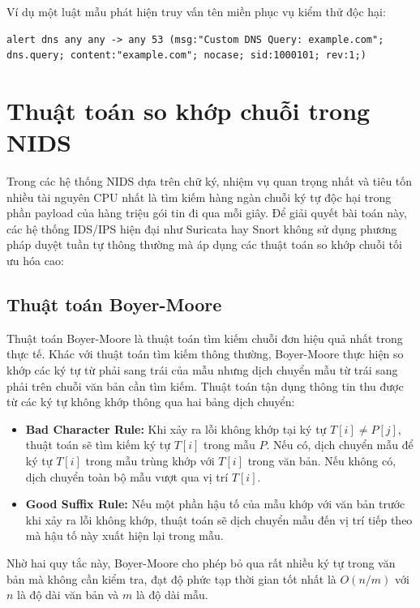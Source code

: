 Ví dụ một luật mẫu phát hiện truy vấn tên miền phục vụ kiểm thử độc hại:
\begin{verbatim}
alert dns any any -> any 53 (msg:"Custom DNS Query: example.com";
dns.query; content:"example.com"; nocase; sid:1000101; rev:1;)
\end{verbatim}

\section{Thuật toán so khớp chuỗi trong NIDS}
Trong các hệ thống NIDS dựa trên chữ ký, nhiệm vụ quan trọng nhất và tiêu tốn nhiều tài nguyên CPU nhất là tìm kiếm hàng ngàn chuỗi ký tự độc hại trong phần payload của hàng triệu gói tin đi qua mỗi giây. Để giải quyết bài toán này, các hệ thống IDS/IPS hiện đại như Suricata hay Snort không sử dụng phương pháp duyệt tuần tự thông thường mà áp dụng các thuật toán so khớp chuỗi tối ưu hóa cao:

\subsection{Thuật toán Boyer-Moore}
Thuật toán Boyer-Moore là thuật toán tìm kiếm chuỗi đơn hiệu quả nhất trong thực tế. Khác với thuật toán tìm kiếm thông thường, Boyer-Moore thực hiện so khớp các ký tự từ phải sang trái của mẫu nhưng dịch chuyển mẫu từ trái sang phải trên chuỗi văn bản cần tìm kiếm. 
Thuật toán tận dụng thông tin thu được từ các ký tự không khớp thông qua hai bảng dịch chuyển:
\begin{itemize}
    \item \textbf{Bad Character Rule:} Khi xảy ra lỗi không khớp tại ký tự $T[i] \neq P[j]$, thuật toán sẽ tìm kiếm ký tự $T[i]$ trong mẫu $P$. Nếu có, dịch chuyển mẫu để ký tự $T[i]$ trong mẫu trùng khớp với $T[i]$ trong văn bản. Nếu không có, dịch chuyển toàn bộ mẫu vượt qua vị trí $T[i]$.
    \item \textbf{Good Suffix Rule:} Nếu một phần hậu tố của mẫu khớp với văn bản trước khi xảy ra lỗi không khớp, thuật toán sẽ dịch chuyển mẫu đến vị trí tiếp theo mà hậu tố này xuất hiện lại trong mẫu.
\end{itemize}
Nhờ hai quy tắc này, Boyer-Moore cho phép bỏ qua rất nhiều ký tự trong văn bản mà không cần kiểm tra, đạt độ phức tạp thời gian tốt nhất là $O(n/m)$ với $n$ là độ dài văn bản và $m$ là độ dài mẫu.

